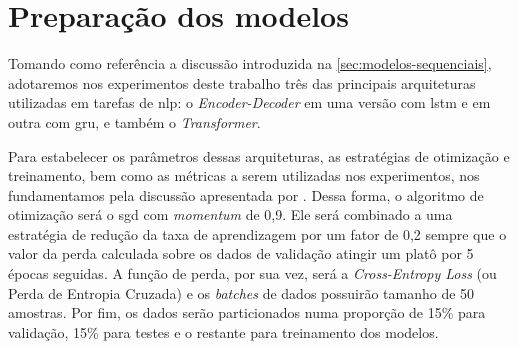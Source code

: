 \section{Preparação dos modelos}
\label{sec:metodologia-preparacao-modelos}







Tomando como referência a discussão introduzida na \autoref{sec:modelos-sequenciais}, adotaremos nos experimentos deste trabalho três das principais arquiteturas utilizadas em tarefas de \acrfull{nlp}: o \textit{Encoder-Decoder} em uma versão com \acrfull{lstm} e em outra com \acrfull{gru}, e também o \textit{Transformer}.


Para estabelecer os parâmetros dessas arquiteturas, as estratégias de otimização e treinamento, bem como as métricas a serem utilizadas nos experimentos, nos fundamentamos pela discussão apresentada por .
Dessa forma, o algoritmo de otimização será o \acrfull{sgd} com \textit{momentum} de 0,9. Ele será combinado a uma estratégia de redução da taxa de aprendizagem por um fator de 0,2 sempre que o valor da perda calculada sobre os dados de validação atingir um platô por 5 épocas seguidas. A função de perda, por sua vez, será a \textit{Cross-Entropy Loss} (ou Perda de Entropia Cruzada) e os \textit{batches} de dados possuirão tamanho de 50 amostras. Por fim, os dados serão particionados numa proporção de 15\% para validação, 15\% para testes e o restante para treinamento dos modelos.

